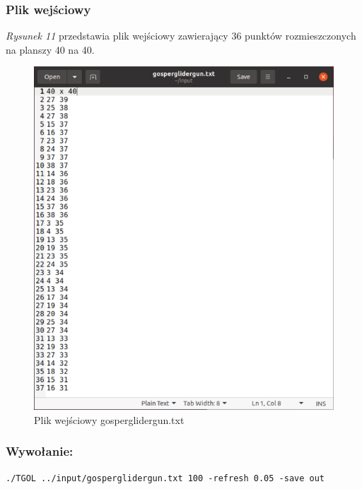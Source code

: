 \documentclass[11pt,a4paper]{report}
\begin{document}
\begin {itemize}
\subsubsection {Plik wejściowy}
\textsl{Rysunek 11} przedstawia plik wejściowy zawierający 36 punktów rozmieszczonych na planszy 40 na 40.
\begin{figure}[!ht]
\centerline{\includegraphics{img/input_gosperglidergun.png}}
\caption{Plik wejściowy gosperglidergun.txt}
\end{figure}
\subsubsection {Wywołanie:}
\texttt{./TGOL ../input/gosperglidergun.txt 100 -refresh 0.05 -save out}

\end{itemize}
\end{document}
